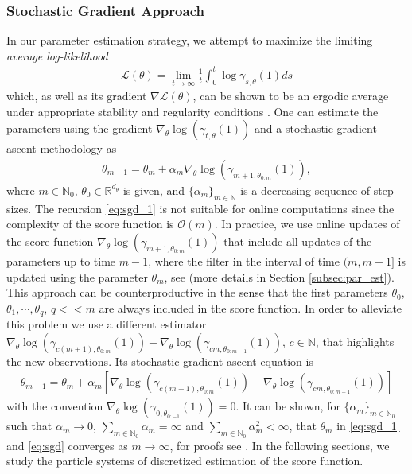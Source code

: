 \documentclass[english]{article}
\begin{document}
\subsubsection{Stochastic Gradient Approach}
In our parameter estimation strategy, we attempt to maximize the limiting \textit{average log-likelihood}
\begin{align*}
\mathcal{L}(\theta)=\lim_{t\rightarrow \infty}\frac{1}{t}\int_{0}^t \log \gamma_{s,\theta}(1)ds
\end{align*}
which, as well as its gradient $\nabla \mathcal{L}(\theta)$, can be shown to be an ergodic average under appropriate stability and regularity conditions \cite{surace}. One can estimate the parameters using the gradient $\nabla_\theta \log \left(\gamma_{t, \theta}(1)\right)$ and a stochastic gradient ascent methodology as
\begin{align}
\theta_{m+1}=\theta_{m}+\alpha_m  \nabla_\theta \log \left(\gamma_{m+1, \theta_{0:m}}(1)\right),
\label{eq:sgd_1}
\end{align}
where $m\in \mathbb{N}_0$, $\theta_0 \in \mathbb{R}^{d_\theta}$ is given, and $\{\alpha_m\}_{m \in \mathbb{N}}$ is a decreasing sequence of step-sizes. The recursion \eqref{eq:sgd_1} is not suitable for online computations since the complexity of the score function is $\mathcal{O}(m)$. In practice, we use online updates of the score function $\nabla_\theta \log \left(\gamma_{m+1, \theta_{0:m}}(1)\right)$ that include all updates of the parameters up to time $m-1$, where the filter in the interval of time $(m,m+1]$ is updated using the parameter $\theta_m$, see \cite{legland, kantas} (more details in Section \ref{subsec:par_est}). This approach can be counterproductive in the sense that the first parameters $\theta_0$, $\theta_1,\cdots, \theta_{q}$, $q<<m$ 
are always included in the score function. In order to alleviate this problem we use a different estimator $\nabla_\theta \log \left(\gamma_{c(m+1), \theta_{0:m}}(1)\right)-\nabla_\theta \log \left(\gamma_{cm, \theta_{0:m-1}}(1)\right)$, $c\in \mathbb{N}$, that highlights the new observations. Its stochastic gradient ascent equation is
\begin{align}
\theta_{m+1}=\theta_{m}+\alpha_m  \left[\nabla_\theta \log \left(\gamma_{c(m+1), \theta_{0:m}}(1)\right)-\nabla_\theta \log \left(\gamma_{cm, \theta_{0:m-1}}(1)\right)\right]
\label{eq:sgd}
\end{align}
with the convention $\nabla_\theta \log \left(\gamma_{0, \theta_{0:-1}}(1)\right)=0$. It can be shown, for $\{\alpha_m\}_{m\in \mathbb{N}_0}$ such that $\alpha_m\to 0$, $\sum_{m \in \mathbb{N}_0}\alpha_m=\infty$ and $\sum_{m \in \mathbb{N}_0}\alpha_m^2 <\infty$, that $\theta_m$ in \eqref{eq:sgd_1} and \eqref{eq:sgd} converges as $m\rightarrow \infty$, for proofs see \cite{BMP90,legland}. In the following sections, we study the particle systems of discretized estimation of the score function.
\end{document}
